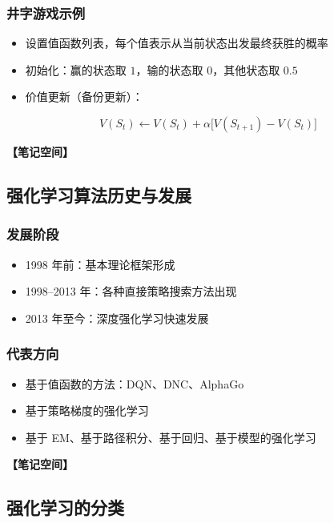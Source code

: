 \documentclass[12pt,a4paper]{article}
\newcommand{\notespace}[1][3cm]{%
  \vspace{#1}%
  \noindent\textbf{【笔记空间】}%
  \vspace{#1}%
}
\newcommand{\1}{\mathbf{1}}
\begin{document}
\subsubsection*{井字游戏示例}

\begin{itemize}[leftmargin=2em]
  \item 设置值函数列表，每个值表示从当前状态出发最终获胜的概率
  \item 初始化：赢的状态取 $1$，输的状态取 $0$，其他状态取 $0.5$
  \item 价值更新（备份更新）：
\end{itemize}

\begin{equation}
V(S_t) \leftarrow V(S_t) + \alpha \bigl[V(S_{t+1}) - V(S_t)\bigr]
\end{equation}

\notespace[2cm]

\subsection{强化学习算法历史与发展}

\subsubsection*{发展阶段}

\begin{itemize}[leftmargin=2em]
  \item 1998 年前：基本理论框架形成
  \item 1998--2013 年：各种直接策略搜索方法出现
  \item 2013 年至今：深度强化学习快速发展
\end{itemize}

\subsubsection*{代表方向}

\begin{itemize}[leftmargin=2em]
  \item 基于值函数的方法：DQN、DNC、AlphaGo
  \item 基于策略梯度的强化学习
  \item 基于 EM、基于路径积分、基于回归、基于模型的强化学习
\end{itemize}

\notespace[2cm]

\subsection{强化学习的分类}
\end{document}
